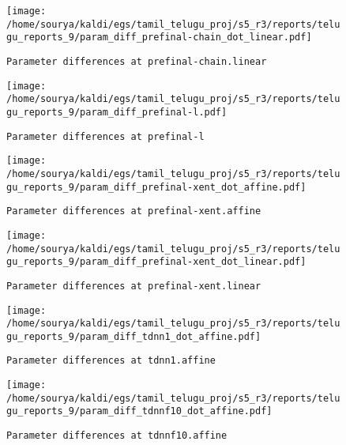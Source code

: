 \documentclass[prl,10pt,twocolumn]{revtex4}
\begin{document}
\newpage
\begin{figure}[h]
  \begin{center}
    \caption{\texttt{Parameter differences at prefinal-chain.linear}}
    \texttt{[image: /home/sourya/kaldi/egs/tamil\_telugu\_proj/s5\_r3/reports/telugu\_reports\_9/param\_diff\_prefinal-chain\_dot\_linear.pdf]}
  \end{center}
\end{figure}
\clearpage


\newpage
\begin{figure}[h]
  \begin{center}
    \caption{\texttt{Parameter differences at prefinal-l}}
    \texttt{[image: /home/sourya/kaldi/egs/tamil\_telugu\_proj/s5\_r3/reports/telugu\_reports\_9/param\_diff\_prefinal-l.pdf]}
  \end{center}
\end{figure}
\clearpage


\newpage
\begin{figure}[h]
  \begin{center}
    \caption{\texttt{Parameter differences at prefinal-xent.affine}}
    \texttt{[image: /home/sourya/kaldi/egs/tamil\_telugu\_proj/s5\_r3/reports/telugu\_reports\_9/param\_diff\_prefinal-xent\_dot\_affine.pdf]}
  \end{center}
\end{figure}
\clearpage


\newpage
\begin{figure}[h]
  \begin{center}
    \caption{\texttt{Parameter differences at prefinal-xent.linear}}
    \texttt{[image: /home/sourya/kaldi/egs/tamil\_telugu\_proj/s5\_r3/reports/telugu\_reports\_9/param\_diff\_prefinal-xent\_dot\_linear.pdf]}
  \end{center}
\end{figure}
\clearpage


\newpage
\begin{figure}[h]
  \begin{center}
    \caption{\texttt{Parameter differences at tdnn1.affine}}
    \texttt{[image: /home/sourya/kaldi/egs/tamil\_telugu\_proj/s5\_r3/reports/telugu\_reports\_9/param\_diff\_tdnn1\_dot\_affine.pdf]}
  \end{center}
\end{figure}
\clearpage


\newpage
\begin{figure}[h]
  \begin{center}
    \caption{\texttt{Parameter differences at tdnnf10.affine}}
    \texttt{[image: /home/sourya/kaldi/egs/tamil\_telugu\_proj/s5\_r3/reports/telugu\_reports\_9/param\_diff\_tdnnf10\_dot\_affine.pdf]}
  \end{center}
\end{figure}
\clearpage
\end{document}
